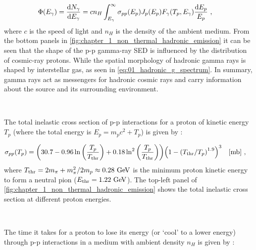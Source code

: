 \begin{equation}
    \begin{aligned}
	\Phi\qty(E_\gamma)&=\dv{N_\gamma}{E_\gamma}=cn_H\int_{E_\gamma}^\infty\sigma_{pp}\qty(E_p)J_p\qty(E_p)F_\gamma\qty(T_p,E_\gamma)\frac{\dd{E_p}}{E_p}\text{ ,}
\end{aligned} \label{eq:01_hadronic_g_spectrum}
\end{equation}
\noindent where $c$ is the speed of light and $n_H$ is the density of the ambient medium.
From the bottom panels in \autoref{fig:chapter_1_non_thermal_hadronic_emission} it can be seen that the shape of the p-p gamma-ray SED is influenced by the distribution of cosmic-ray protons. While the spatial morphology of hadronic gamma rays is shaped by interstellar gas, as seen in \autoref{eq:01_hadronic_g_spectrum}. In summary, gamma rays act as messengers for hadronic cosmic rays and carry information about the source and its surrounding environment.
\par~\par
The total inelastic cross section of p-p interactions for a proton of kinetic energy $T_p$ (where the total energy is $E_p=m_pc^2+T_p$) is given by \citep{2014PhRvD..90l3014K}:

\begin{equation}
    \begin{aligned}
    \sigma_{pp}\qty(T_p) &= \qty(30.7-0.96\ln\qty(\frac{T_p}{T_\text{thr}})+0.18\ln^2\qty(\frac{T_p}{T_\text{thr}}))\qty(1-\qty(T_\text{thr}/T_p)^{1.9})^3\quad\qty[\si{\milli\barn}]\text{ ,}
    \end{aligned} \label{eq:chapter1_non_thermal_pp_cross_section}
\end{equation}
\noindent where $T_\text{thr}=2m_\pi + m_\pi^2/2m_p \approx 0.28~\si{\giga\electronvolt}$ is the minimum proton kinetic energy to form a neutral pion ($E_\text{thr}=1.22~\si{\giga\electronvolt}$). The top-left panel of \autoref{fig:chapter_1_non_thermal_hadronic_emission} shows the total inelastic cross section at different proton energies.
\par~\par
The time it takes for a proton to lose its energy (or `cool' to a lower energy) through p-p interactions in a medium with ambient density $n_H$ is given by \citep{2009ARA&A..47..523H}:

